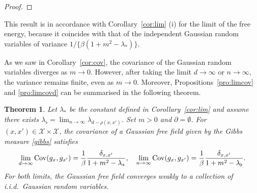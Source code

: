 \documentclass[a4paper,11pt]{article}
\theoremstyle{plain}
\newtheorem{theorem}{Theorem}[section]
\theoremstyle{definition}
\begin{document}
\begin{proof}
\end{proof}

This result is in accordance with Corollary~\ref{cor:lim}
(i) for the limit of the free energy, because it
coincides with that of the independent Gaussian random
variables of variance $1/\{\beta(1+m^2-\lambda_*)\}$.

As we saw in Corollary~\ref{cor:cov}, the covariance
of the Gaussian random variables diverges as $m\to 0$.
However, after taking the limit $d\to\infty$ or
$n\to\infty$, the variance remains finite, even as $m\to 0$.
Moreover, Propositions~\ref{pro:limcov} and
\ref{pro:limcovd} can be summarised in the following theorem.

\begin{theorem}\label{thm:limcov}
  Let $\lambda_*$ be the constant defined in
  Corollary~\ref{cor:lim} and assume there exists
  $\lambda_\flat=\lim_{n\to\infty}\lambda_{d-\rho(x,x')}$.
  Set $m>0$ and $\partial=\emptyset$.
  For $(x,x')\in\mathcal{X}\times\mathcal{X}$,
  the covariance of a Gaussian free field given by
  the Gibbs measure \eqref{gibbs} satisfies 
  \begin{equation*}
    \lim_{d\to\infty} {\rm Cov}(g_x,g_{x'})=
    \frac{1}{\beta}\frac{\delta_{x,x'}}{1+m^2-\lambda_*},
    \quad
    \lim_{n\to\infty} {\rm Cov}(g_x,g_{x'})=
    \frac{1}{\beta}\frac{\delta_{x,x'}}{1+m^2-\lambda_\flat}.
  \end{equation*}  
  For both limits, the Gaussian free field converges weakly
  to a collection of i.i.d.\ Gaussian random variables.
\end{theorem}
\end{document}

